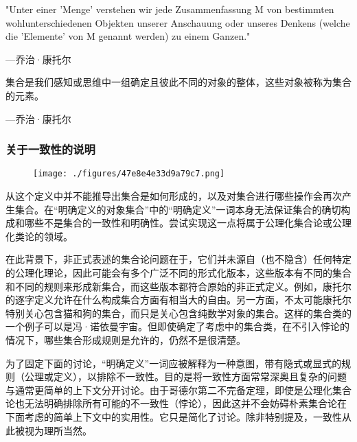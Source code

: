 "Unter einer 'Menge' verstehen wir jede Zusammenfassung M von bestimmten wohlunterschiedenen Objekten unserer Anschauung oder unseres Denkens (welche die 'Elemente' von M genannt werden) zu einem Ganzen."

— 乔治·康托尔

集合是我们感知或思维中一组确定且彼此不同的对象的整体，这些对象被称为集合的元素。

— 乔治·康托尔
\subsubsection{关于一致性的说明}  
\begin{figure}[ht]
\centering
\texttt{[image: ./figures/47e8e4e33d9a79c7.png]}
\caption{} \label{fig_PSJHL_2}
\end{figure}
从这个定义中并不能推导出集合是如何形成的，以及对集合进行哪些操作会再次产生集合。在“明确定义的对象集合”中的“明确定义”一词本身无法保证集合的确切构成和哪些不是集合的一致性和明确性。尝试实现这一点将属于公理化集合论或公理化类论的领域。

在此背景下，非正式表述的集合论问题在于，它们并未源自（也不隐含）任何特定的公理化理论，因此可能会有多个广泛不同的形式化版本，这些版本有不同的集合和不同的规则来形成新集合，而这些版本都符合原始的非正式定义。例如，康托尔的逐字定义允许在什么构成集合方面有相当大的自由。另一方面，不太可能康托尔特别关心包含猫和狗的集合，而只是关心包含纯数学对象的集合。这样的集合类的一个例子可以是冯·诺依曼宇宙。但即使确定了考虑中的集合类，在不引入悖论的情况下，哪些集合形成规则是允许的，仍然不是很清楚。

为了固定下面的讨论，“明确定义”一词应被解释为一种意图，带有隐式或显式的规则（公理或定义），以排除不一致性。目的是将一致性方面常常深奥且复杂的问题与通常更简单的上下文分开讨论。由于哥德尔第二不完备定理，即使是公理化集合论也无法明确排除所有可能的不一致性（悖论），因此这并不会妨碍朴素集合论在下面考虑的简单上下文中的实用性。它只是简化了讨论。除非特别提及，一致性从此被视为理所当然。